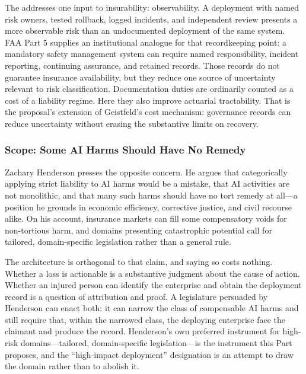 The \Charter{} addresses one input to insurability: observability. A deployment
with named risk owners, tested rollback, logged incidents, and independent review
presents a more observable risk than an undocumented deployment of the same
system. FAA Part 5 supplies an institutional
analogue for that recordkeeping point: a mandatory safety management system can
require named responsibility, incident reporting, continuing assurance, and
retained records.
Those records do not guarantee insurance availability, but they reduce one source
of uncertainty relevant to risk classification. Documentation duties are
ordinarily counted as a cost of a liability regime. Here they also improve
actuarial tractability. That is the proposal's extension of Geistfeld's cost
mechanism: governance records can reduce uncertainty without erasing the
substantive limits on recovery.

\subsubsection{Scope: Some AI Harms Should Have No Remedy}

Zachary Henderson presses the opposite concern. He argues that categorically
applying strict liability to AI harms would be a mistake, that AI activities are
not monolithic, and that many such harms should have no tort remedy at
all---a position he grounds in economic efficiency, corrective justice, and civil
recourse alike.
On his account, insurance markets can fill some compensatory voids for
non-tortious harm, and domains presenting catastrophic potential call for
tailored, domain-specific legislation rather than a general
rule.

The architecture is orthogonal to that claim, and saying so costs nothing.
Whether a loss is actionable is a substantive judgment about the cause of action.
Whether an injured person can identify the enterprise and obtain the deployment
record is a question of attribution and proof. A legislature persuaded by
Henderson can enact both: it can narrow the class of compensable AI harms and
still require that, within the narrowed class, the deploying enterprise face the
claimant and produce the record. Henderson's own preferred instrument for
high-risk domains---tailored, domain-specific legislation---is the instrument this
Part proposes, and the ``high-impact deployment'' designation is an attempt to
draw the domain rather than to abolish it.

